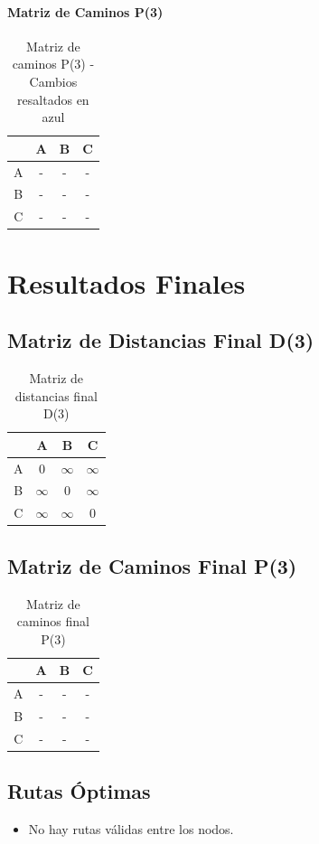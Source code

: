 \documentclass[12pt]{article}
\begin{document}
\paragraph{Matriz de Caminos P(3)}
\begin{table}[h!]
\centering
\begin{tabular}{|c|c|c|c|}
\hline
 & A & B & C \\\hline
A & - & - & - \\\hline
B & - & - & - \\\hline
C & - & - & - \\\hline
\end{tabular}
\caption{Matriz de caminos P(3) - Cambios resaltados en azul}
\end{table}

\clearpage
\section{Resultados Finales}
\subsection{Matriz de Distancias Final D(3)}
\begin{table}[h!]
\centering
\begin{tabular}{|c|c|c|c|}
\hline
 & A & B & C \\\hline
A & 0 & $\infty$ & $\infty$ \\\hline
B & $\infty$ & 0 & $\infty$ \\\hline
C & $\infty$ & $\infty$ & 0 \\\hline
\end{tabular}
\caption{Matriz de distancias final D(3)}
\end{table}

\clearpage
\subsection{Matriz de Caminos Final P(3)}
\begin{table}[h!]
\centering
\begin{tabular}{|c|c|c|c|}
\hline
 & A & B & C \\\hline
A & - & - & - \\\hline
B & - & - & - \\\hline
C & - & - & - \\\hline
\end{tabular}
\caption{Matriz de caminos final P(3)}
\end{table}

\clearpage
\subsection{Rutas Óptimas}
\begin{itemize}
\item No hay rutas válidas entre los nodos.
\end{itemize}
\end{document}
